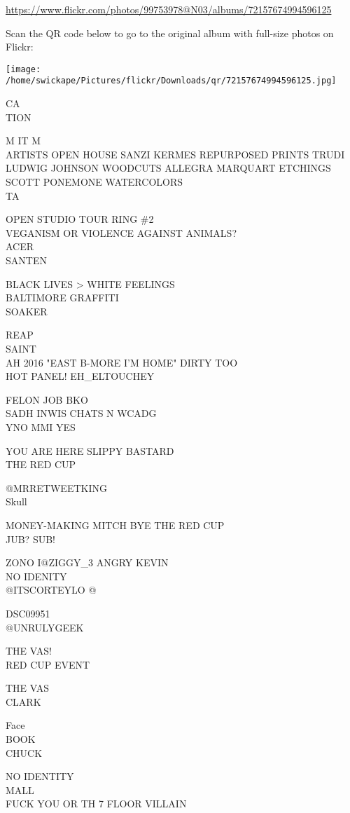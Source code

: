 \documentclass[10pt,letterpaper]{article}
\begin{document}
\url{https://www.flickr.com/photos/99753978@N03/albums/72157674994596125}

Scan the QR code below to go to the original album with full-size photos on Flickr:

\texttt{[image: /home/swickape/Pictures/flickr/Downloads/qr/72157674994596125.jpg]}
\pagebreak

CA\\
TION

M IT M\\
ARTISTS OPEN HOUSE SANZI KERMES REPURPOSED PRINTS TRUDI LUDWIG JOHNSON WOODCUTS ALLEGRA MARQUART ETCHINGS SCOTT PONEMONE WATERCOLORS\\
TA

OPEN STUDIO TOUR RING \#2\\
VEGANISM OR VIOLENCE AGAINST ANIMALS?\\
ACER\\
SANTEN

BLACK LIVES > WHITE FEELINGS\\
BALTIMORE GRAFFITI\\
SOAKER

REAP\\
SAINT\\
AH 2016 "EAST B{-}MORE I'M HOME"  DIRTY TOO\\
HOT PANEL! EH\_ELTOUCHEY

FELON JOB BKO\\
SADH INWIS CHATS N WCADG\\
YNO MMI YES

YOU ARE HERE SLIPPY BASTARD\\
THE RED CUP

@MRRETWEETKING\\
Skull

MONEY{-}MAKING MITCH BYE THE RED CUP\\
JUB? SUB!

ZONO I@ZIGGY\_3 ANGRY KEVIN\\
NO IDENITY\\
@ITSCORTEYLO @

DSC09951\\
@UNRULYGEEK

THE VAS!\\
RED CUP EVENT

THE VAS\\
CLARK

Face\\
BOOK\\
CHUCK

NO IDENTITY\\
MALL\\
FUCK YOU OR TH 7 FLOOR VILLAIN
\end{document}
